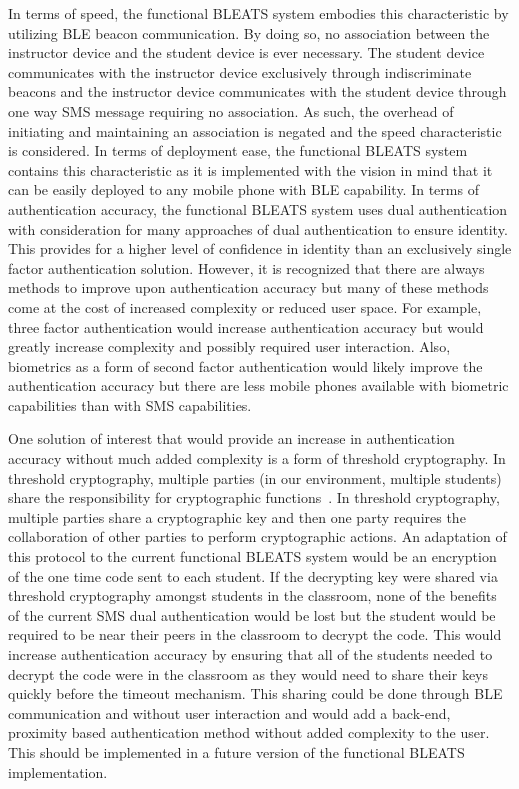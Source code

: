 In terms of speed, the functional BLEATS system embodies this characteristic by
utilizing BLE beacon communication. By doing so, no association between the
instructor device and the student device is ever necessary. The student device
communicates with the instructor device exclusively through indiscriminate
beacons and the instructor device communicates with the student device through
one way SMS message requiring no association. As such, the overhead of
initiating and maintaining an association is negated and the speed
characteristic is considered. In terms of deployment ease, the functional
BLEATS system contains this characteristic as it is implemented with the vision
in mind that it can be easily deployed to any mobile phone with BLE capability.
In terms of authentication accuracy, the functional BLEATS system uses dual
authentication with consideration for many approaches of dual authentication to
ensure identity. This provides for a higher level of confidence in identity
than an exclusively single factor authentication solution. However, it is
recognized that there are always methods to improve upon authentication
accuracy but many of these methods come at the cost of increased complexity or
reduced user space. For example, three factor authentication would increase
authentication accuracy but would greatly increase complexity and possibly
required user interaction. Also, biometrics as a form of second factor
authentication would likely improve the authentication accuracy but there are
less mobile phones available with biometric capabilities than with SMS
capabilities. 

One solution of interest that would provide an increase in authentication
accuracy without much added complexity is a form of threshold cryptography. In
threshold cryptography, multiple parties (in our environment, multiple
students) share the responsibility for cryptographic
functions~\cite{zhou1999securing}. In threshold cryptography, multiple parties
share a cryptographic key and then one party requires the collaboration of
other parties to perform cryptographic actions. An adaptation of this protocol
to the current functional BLEATS system would be an encryption of the one time
code sent to each student. If the decrypting key were shared via threshold
cryptography amongst students in the classroom, none of the benefits of the
current SMS dual authentication would be lost but the student would be required
to be near their peers in the classroom to decrypt the code. This would
increase authentication accuracy by ensuring that all of the students needed to
decrypt the code were in the classroom as they would need to share their keys
quickly before the timeout mechanism. This sharing could be done through BLE
communication and without user interaction and would add a back-end, proximity
based authentication method without added complexity to the user. This should
be implemented in a future version of the functional BLEATS implementation.

